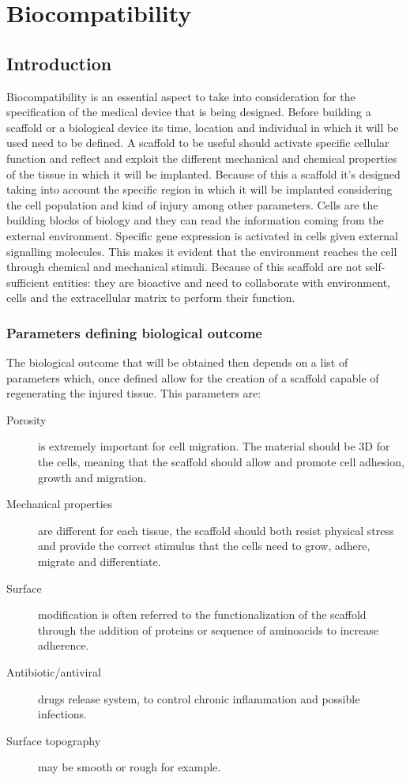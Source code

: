 \graphicspath{{chapters/02/images/}}
\chapter{Biocompatibility}

\section{Introduction}
Biocompatibility is an essential aspect to take into consideration for the specification of the medical device that is being designed.
Before building a scaffold or a biological device its time, location and individual in which it will be used need to be defined.
A scaffold to be useful should activate specific cellular function and reflect and exploit the different mechanical and chemical properties of the tissue in which it will be implanted.
Because of this a scaffold it's designed taking into account the specific region in which it will be implanted considering the cell population and kind of injury among other parameters.
Cells are the building blocks of biology and they can read the information coming from the external environment.
Specific gene expression is activated in cells given external signalling molecules.
This makes it evident that the environment reaches the cell through chemical and mechanical stimuli.
Because of this scaffold are not self-sufficient entities: they are bioactive and need to collaborate with environment, cells and the extracellular matrix to perform their function.

	\subsection{Parameters defining biological outcome}
	The biological outcome that will be obtained then depends on a list of parameters which, once defined allow for the creation of a scaffold capable of regenerating the injured tissue.
	This parameters are:

	\begin{multicols}{2}
		\begin{description}
		\item[Porosity] is extremely important for cell migration.
			The material should be 3D for the cells, meaning that the scaffold should allow and promote cell adhesion, growth and migration.
		\item[Mechanical properties] are different for each tissue, the scaffold should both resist physical stress and provide the correct stimulus that the cells need to grow, adhere, migrate and differentiate.
		\item[Surface] modification is often referred to the functionalization of the scaffold through the addition of proteins or sequence of aminoacids to increase adherence.
		\item[Antibiotic/antiviral] drugs release system, to control chronic inflammation and possible infections.
		\item[Surface topography] may be smooth or rough for example.
		\end{description}
	\end{multicols}

